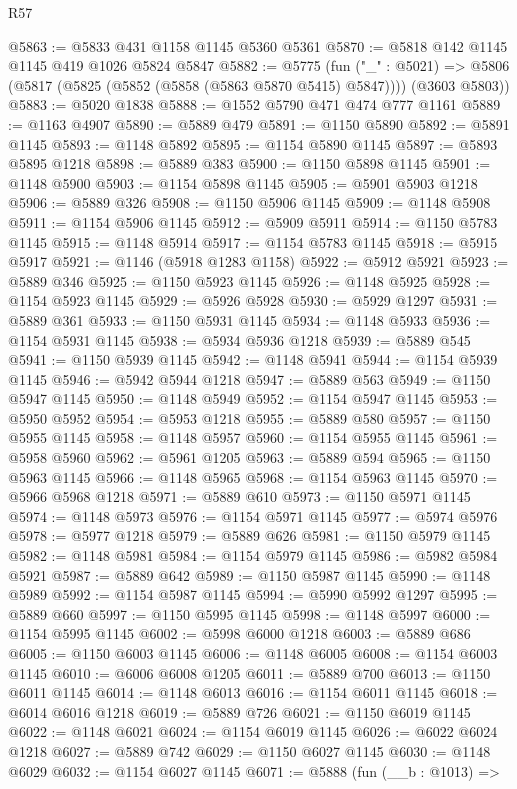 \begin{lexlean}{R57}
\begin{coremodule}
@5863 := @5833 @431 @1158 @1145 @5360 @5361
@5870 := @5818 @142 @1145 @1145 @419 @1026 @5824 @5847
@5882 := @5775
    (fun ("_" : @5021) =>
    @5806 (@5817 (@5825 (@5852 (@5858 (@5863 @5870 @5415) @5847)))) (@3603 @5803))
@5883 := @5020 @1838
@5888 := @1552 @5790 @471 @474 @777 @1161
@5889 := @1163 @4907
@5890 := @5889 @479
@5891 := @1150 @5890
@5892 := @5891 @1145
@5893 := @1148 @5892
@5895 := @1154 @5890 @1145
@5897 := @5893 @5895 @1218
@5898 := @5889 @383
@5900 := @1150 @5898 @1145
@5901 := @1148 @5900
@5903 := @1154 @5898 @1145
@5905 := @5901 @5903 @1218
@5906 := @5889 @326
@5908 := @1150 @5906 @1145
@5909 := @1148 @5908
@5911 := @1154 @5906 @1145
@5912 := @5909 @5911
@5914 := @1150 @5783 @1145
@5915 := @1148 @5914
@5917 := @1154 @5783 @1145
@5918 := @5915 @5917
@5921 := @1146 (@5918 @1283 @1158)
@5922 := @5912 @5921
@5923 := @5889 @346
@5925 := @1150 @5923 @1145
@5926 := @1148 @5925
@5928 := @1154 @5923 @1145
@5929 := @5926 @5928
@5930 := @5929 @1297
@5931 := @5889 @361
@5933 := @1150 @5931 @1145
@5934 := @1148 @5933
@5936 := @1154 @5931 @1145
@5938 := @5934 @5936 @1218
@5939 := @5889 @545
@5941 := @1150 @5939 @1145
@5942 := @1148 @5941
@5944 := @1154 @5939 @1145
@5946 := @5942 @5944 @1218
@5947 := @5889 @563
@5949 := @1150 @5947 @1145
@5950 := @1148 @5949
@5952 := @1154 @5947 @1145
@5953 := @5950 @5952
@5954 := @5953 @1218
@5955 := @5889 @580
@5957 := @1150 @5955 @1145
@5958 := @1148 @5957
@5960 := @1154 @5955 @1145
@5961 := @5958 @5960
@5962 := @5961 @1205
@5963 := @5889 @594
@5965 := @1150 @5963 @1145
@5966 := @1148 @5965
@5968 := @1154 @5963 @1145
@5970 := @5966 @5968 @1218
@5971 := @5889 @610
@5973 := @1150 @5971 @1145
@5974 := @1148 @5973
@5976 := @1154 @5971 @1145
@5977 := @5974 @5976
@5978 := @5977 @1218
@5979 := @5889 @626
@5981 := @1150 @5979 @1145
@5982 := @1148 @5981
@5984 := @1154 @5979 @1145
@5986 := @5982 @5984 @5921
@5987 := @5889 @642
@5989 := @1150 @5987 @1145
@5990 := @1148 @5989
@5992 := @1154 @5987 @1145
@5994 := @5990 @5992 @1297
@5995 := @5889 @660
@5997 := @1150 @5995 @1145
@5998 := @1148 @5997
@6000 := @1154 @5995 @1145
@6002 := @5998 @6000 @1218
@6003 := @5889 @686
@6005 := @1150 @6003 @1145
@6006 := @1148 @6005
@6008 := @1154 @6003 @1145
@6010 := @6006 @6008 @1205
@6011 := @5889 @700
@6013 := @1150 @6011 @1145
@6014 := @1148 @6013
@6016 := @1154 @6011 @1145
@6018 := @6014 @6016 @1218
@6019 := @5889 @726
@6021 := @1150 @6019 @1145
@6022 := @1148 @6021
@6024 := @1154 @6019 @1145
@6026 := @6022 @6024 @1218
@6027 := @5889 @742
@6029 := @1150 @6027 @1145
@6030 := @1148 @6029
@6032 := @1154 @6027 @1145
@6071 := @5888
    (fun (__b : @1013) =>

\end{coremodule}
\end{lexlean}
